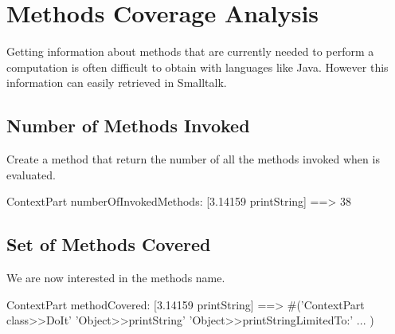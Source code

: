 
\section{Methods Coverage Analysis}

Getting information about methods that are currently needed to perform a computation is often difficult to obtain with languages like Java. However this information can easily retrieved in Smalltalk.

\subsection*{Number of Methods Invoked}
Create a method  that return the number of all the methods invoked when  is evaluated.
\begin{scode}
ContextPart numberOfInvokedMethods: [3.14159 printString]
==> 38
\end{scode}

%        
% 


\subsection*{Set of Methods Covered}
We are now interested in the methods name.
\begin{scode}
ContextPart methodCovered: [3.14159 printString]
==> #('ContextPart class>>DoIt' 'Object>>printString'
 'Object>>printStringLimitedTo:' ... )
\end{scode}



%	
 

